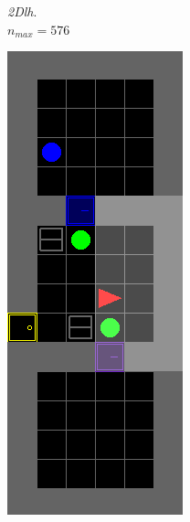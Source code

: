 \documentclass{article}
\begin{document}
\begin{figure}[H]
\begin{subfigure}[b]{0.6\linewidth}
\begin{subfigure}[b]{0.32\linewidth}
    \caption{\textit{2Dlh}. \\
    \(n_{max}=576\)}
  \end{subfigure}
  \hfill
  \begin{subfigure}[b]{0.32\linewidth}
    \centering
    \includegraphics[width=\linewidth]{Tasks/ObstructedMaze/2Dlhb}

\end{subfigure}
\end{subfigure}
\end{figure}
\end{document}

